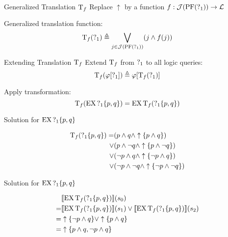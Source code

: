 \begin{frame}{Generalized Translation $\operatorname{T}_f$}
  Replace $\uparrow$ by a function $f : \mathcal{J}(\operatorname{PF}(\operatorname{?}_1)) \to \mathcal{L}$

  Generalized translation function:
  \[ 
    \operatorname{T}_f(\operatorname{?}_1) \triangleq \bigvee_{j\in\mathcal{J}(\operatorname{PF}(\operatorname{?}_1))} (j \land f(j))
  \]
\end{frame}

\begin{frame}{Extending Translation $\operatorname{T}_f$}
  Extend $\operatorname{T}_f$ from $\operatorname{?}_1$ to all logic queries:
  \[ 
    \operatorname{T}_f(\varphi[\operatorname{?}_1]) \triangleq \varphi[\operatorname{T}_f(\operatorname{?}_1)]
  \]
  
  \begin{example}
    Apply transformation:
    \[ \operatorname{T}_f(\operatorname{EX} \operatorname{?}_1\{p,q\}) = \operatorname{EX}\operatorname{T}_f( \operatorname{?}_1\{p,q\}) \]
  \end{example}
\end{frame}

\begin{frame}{Solution for $\operatorname{EX} \operatorname{?}_1\{p,q\}$}
  \begin{example}
    \begin{align*}
      \operatorname{T}_f( \operatorname{?}_1\{p,q\}) 
        =   &(p \land q \land \uparrow\{p\land q\}) \\
        \lor&(p \land \lnot q \land \uparrow\{p\land \lnot q\}) \\
        \lor&(\lnot p \land q \land \uparrow\{\lnot p\land q\}) \\
        \lor&(\lnot p \land \lnot q \land \uparrow\{\lnot p\land \lnot q\})
    \end{align*}
  \end{example}
\end{frame}

\begin{frame}{Solution for $\operatorname{EX} \operatorname{?}_1\{p,q\}$}
  \begin{example}
    \begin{align*}
      & \llbracket \operatorname{EX} \operatorname{T}_f( \operatorname{?}_1\{p,q\}) \rrbracket (s_0) \\
        =& \llbracket \operatorname{EX} \operatorname{T}_f( \operatorname{?}_1\{p,q\}) \rrbracket (s_1) \lor \llbracket \operatorname{EX} \operatorname{T}_f( \operatorname{?}_1\{p,q\}) \rrbracket (s_2) \\
        =& \uparrow\{\lnot p\land q\} \lor \uparrow\{p\land q\} \\
        =& \uparrow\{p\land q, \lnot p\land q\} 
    \end{align*}
  \end{example}
\end{frame}

